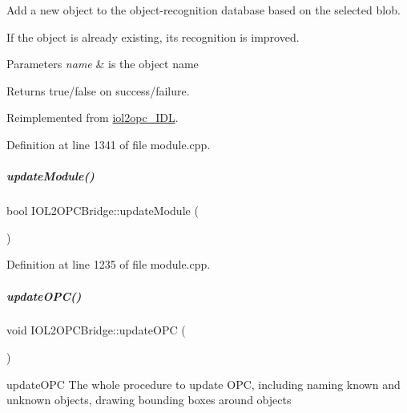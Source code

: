 Add a new object to the object-\/recognition database based on the selected blob. 

If the object is already existing, its recognition is improved. 
\begin{DoxyParams}{Parameters}
{\em name} & is the object name \\
\hline
\end{DoxyParams}
\begin{DoxyReturn}{Returns}
true/false on success/failure. 
\end{DoxyReturn}


Reimplemented from \hyperlink{classiol2opc__IDL_a6215d1e2e1865dcf4584e925b8c1d1be}{iol2opc\+\_\+\+I\+DL}.



Definition at line 1341 of file module.\+cpp.

\mbox{\label{group__iol2opc_aaf70332dcf01dc12e2b849c4ff6620af}} 
\subparagraph{\texorpdfstring{update\+Module()}{updateModule()}}
{\footnotesize\ttfamily bool I\+O\+L2\+O\+P\+C\+Bridge\+::update\+Module (\begin{DoxyParamCaption}{ }\end{DoxyParamCaption})\hspace{0.3cm}{\ttfamily [protected]}}



Definition at line 1235 of file module.\+cpp.

\mbox{\label{group__iol2opc_ab3fd466f349b214e52cc524b837e2277}} 
\subparagraph{\texorpdfstring{update\+O\+P\+C()}{updateOPC()}}
{\footnotesize\ttfamily void I\+O\+L2\+O\+P\+C\+Bridge\+::update\+O\+PC (\begin{DoxyParamCaption}{ }\end{DoxyParamCaption})\hspace{0.3cm}{\ttfamily [protected]}}



update\+O\+PC The whole procedure to update O\+PC, including naming known and unknown objects, drawing bounding boxes around objects 



